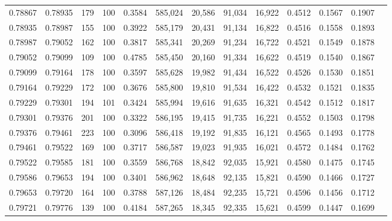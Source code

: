 \begin{tabular}{rrrrrrrrrrrrr}
0.78867 & 0.78935 &   179 & 100 &                                     0.3584 & 585,024 &  20,586 &  91,034 &  16,922 & 0.4512 & 0.1567 & 0.1907 \\
0.78935 & 0.78987 &   155 & 100 &                                     0.3922 & 585,179 &  20,431 &  91,134 &  16,822 & 0.4516 & 0.1558 & 0.1893 \\
0.78987 & 0.79052 &   162 & 100 &                                     0.3817 & 585,341 &  20,269 &  91,234 &  16,722 & 0.4521 & 0.1549 & 0.1878 \\
0.79052 & 0.79099 &   109 & 100 &                                     0.4785 & 585,450 &  20,160 &  91,334 &  16,622 & 0.4519 & 0.1540 & 0.1867 \\
0.79099 & 0.79164 &   178 & 100 &                                     0.3597 & 585,628 &  19,982 &  91,434 &  16,522 & 0.4526 & 0.1530 & 0.1851 \\
0.79164 & 0.79229 &   172 & 100 &                                     0.3676 & 585,800 &  19,810 &  91,534 &  16,422 & 0.4532 & 0.1521 & 0.1835 \\
0.79229 & 0.79301 &   194 & 101 &                                     0.3424 & 585,994 &  19,616 &  91,635 &  16,321 & 0.4542 & 0.1512 & 0.1817 \\
0.79301 & 0.79376 &   201 & 100 &                                     0.3322 & 586,195 &  19,415 &  91,735 &  16,221 & 0.4552 & 0.1503 & 0.1798 \\
0.79376 & 0.79461 &   223 & 100 &                                     0.3096 & 586,418 &  19,192 &  91,835 &  16,121 & 0.4565 & 0.1493 & 0.1778 \\
0.79461 & 0.79522 &   169 & 100 &                                     0.3717 & 586,587 &  19,023 &  91,935 &  16,021 & 0.4572 & 0.1484 & 0.1762 \\
0.79522 & 0.79585 &   181 & 100 &                                     0.3559 & 586,768 &  18,842 &  92,035 &  15,921 & 0.4580 & 0.1475 & 0.1745 \\
0.79586 & 0.79653 &   194 & 100 &                                     0.3401 & 586,962 &  18,648 &  92,135 &  15,821 & 0.4590 & 0.1466 & 0.1727 \\
0.79653 & 0.79720 &   164 & 100 &                                     0.3788 & 587,126 &  18,484 &  92,235 &  15,721 & 0.4596 & 0.1456 & 0.1712 \\
0.79721 & 0.79776 &   139 & 100 &                                     0.4184 & 587,265 &  18,345 &  92,335 &  15,621 & 0.4599 & 0.1447 & 0.1699 \\

\end{tabular}
